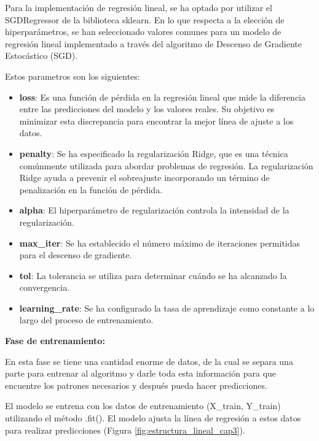 Para la implementación de regresión lineal, se ha optado por utilizar el
SGDRegressor de la biblioteca sklearn. En lo que respecta a la elección de
hiperparámetros, se han seleccionado valores comunes para un modelo de
regresión lineal implementado a través del algoritmo de Descenso de Gradiente Estocástico (SGD).

Estos parametros son los siguientes:

\begin{itemize}
  \item \textbf{loss}: Es una función de pérdida en la regresión lineal que mide la diferencia entre las predicciones del modelo y los valores reales. Su objetivo es minimizar esta discrepancia para encontrar la mejor línea de ajuste a los datos.

  \item \textbf{penalty}: Se ha especificado la regularización Ridge, que es una técnica comúnmente utilizada para abordar problemas de regresión. La regularización Ridge ayuda a prevenir el sobreajuste incorporando un término de penalización en la función de pérdida.

  \item \textbf{alpha}: El hiperparámetro de regularización controla la intensidad de la regularización.

  \item \textbf{max\_iter}: Se ha establecido el número máximo de iteraciones permitidas para el descenso de gradiente.

  \item \textbf{tol}: La tolerancia se utiliza para determinar cuándo se ha alcanzado la convergencia.

  \item \textbf{learning\_rate}: Se ha configurado la tasa de aprendizaje como constante a lo largo del proceso de entrenamiento.
\end{itemize}

\textbf{Fase de entrenamiento:}

En esta fase se tiene una cantidad enorme de datos, de la cual se separa una
parte para entrenar al algoritmo y darle toda esta información para que
encuentre los patrones necesarios y después pueda hacer predicciones.

El modelo se entrena con los datos de entrenamiento (X\_train, Y\_train)
utilizando el método .fit(). El modelo ajusta la línea de regresión a estos
datos para realizar predicciones (Figura \ref{fig:estructura_lineal_cap3}).

